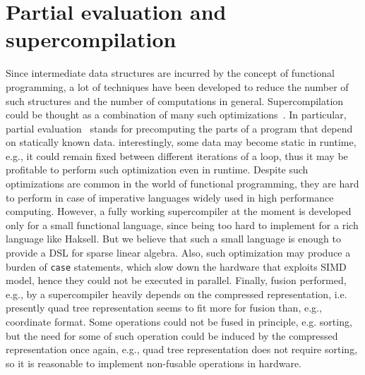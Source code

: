 \documentclass[10pt,conference]{IEEEtran}
\begin{document}
\section{Partial evaluation and supercompilation}
Since intermediate data structures are incurred by the concept of functional programming, a lot of techniques have been developed to reduce the number of such structures and the number of computations in general.
Supercompilation~\cite{supercompilation} could be thought as a combination of many such optimizations~\cite{distillation,WADLER1990231,jones}.
In particular, partial evaluation~\cite{jones} stands for precomputing the parts of a program that depend on statically known data. interestingly, some data may become static in runtime, e.g., it could remain fixed between different iterations of a loop, thus it may be profitable to perform such optimization even in runtime.
Despite such optimizations are common in the world of functional programming, they are hard to perform in case of imperative languages widely used in high performance computing.
However, a fully working supercompiler at the moment is developed only for a small functional language, since being too hard to implement for a rich language like Haksell. But we believe that such a small language is enough to provide a DSL for sparse linear algebra.
Also, such optimization may produce a burden of \texttt{case} statements, which slow down the hardware that exploits SIMD model, hence they could not be executed in parallel.
Finally, fusion performed, e.g., by a supercompiler heavily depends on the compressed representation, i.e. presently quad tree representation seems to fit more for fusion than, e.g., coordinate format. 
Some operations could not be fused in principle, e.g. sorting, but the need for some of such operation could be induced by the compressed representation once again, e.g., quad tree representation does not require sorting, so it is reasonable to implement non-fusable operations in hardware.


 
\end{document}
